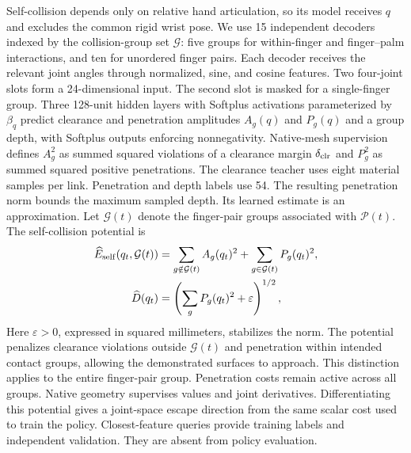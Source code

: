 Self-collision depends only on relative hand articulation, so its model receives $q$ and excludes the common rigid wrist pose. We use 15 independent decoders indexed by the collision-group set $\mathcal G$: five groups for within-finger and finger--palm interactions, and ten for unordered finger pairs. Each decoder receives the relevant joint angles through normalized, sine, and cosine features. Two four-joint slots form a 24-dimensional input. The second slot is masked for a single-finger group. Three 128-unit hidden layers with Softplus activations parameterized by $\beta_q$ predict clearance and penetration amplitudes $A_g(q)$ and $P_g(q)$ and a group depth, with Softplus outputs enforcing nonnegativity. Native-mesh supervision defines $A_g^2$ as summed squared violations of a clearance margin $\delta_{\rm clr}$ and $P_g^2$ as summed squared positive penetrations. The clearance teacher uses eight material samples per link. Penetration and depth labels use 54. The resulting penetration norm bounds the maximum sampled depth. Its learned estimate is an approximation. Let $\mathcal G(t)$ denote the finger-pair groups associated with $\mathcal P(t)$. The self-collision potential is
\begin{equation}
\begin{aligned}
    \widehat E_{\rm self}(q_t,\mathcal G(t))
       &=\sum_{g\notin\mathcal G(t)}A_g(q_t)^2
         +\sum_{g\in\mathcal G(t)}P_g(q_t)^2,\\
    \widehat D(q_t)
       &=\left(\sum_g P_g(q_t)^2+\varepsilon\right)^{1/2},
\end{aligned}
    \label{eq:cart-self-collision}
\end{equation}
Here $\varepsilon>0$, expressed in squared millimeters, stabilizes the norm. The potential penalizes clearance violations outside $\mathcal G(t)$ and penetration within intended contact groups, allowing the demonstrated surfaces to approach. This distinction applies to the entire finger-pair group. Penetration costs remain active across all groups. Native geometry supervises values and joint derivatives. Differentiating this potential gives a joint-space escape direction from the same scalar cost used to train the policy. Closest-feature queries provide training labels and independent validation. They are absent from policy evaluation.


